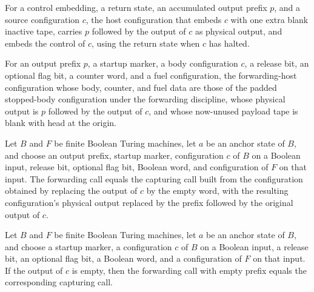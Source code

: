 \begin{definition}
\label{Turing.FinTM.emLoopForwardCfg}
\leanok
{}
For a control embedding, a return state, an accumulated output prefix $p$, and a source
configuration $c$, the host configuration that embeds $c$ with one extra blank inactive
tape, carries $p$ followed by the output of $c$ as physical output, and embeds the
control of $c$, using the return state when $c$ has halted.
\end{definition}

\begin{definition}
\label{Turing.FinTM.emLoopCall}
\leanok
{}
For an output prefix $p$, a startup marker, a body configuration $c$, a release bit, an
optional flag bit, a counter word, and a fuel configuration, the forwarding-host
configuration whose body, counter, and fuel data are those of the padded stopped-body
configuration under the forwarding discipline, whose physical output is $p$ followed by
the output of $c$, and whose now-unused payload tape is blank with head at the origin.
\end{definition}

\begin{lemma}
\label{Turing.FinTM.emLoopCall_frame}
\leanok
{}
Let $B$ and $F$ be finite Boolean Turing machines, let $a$ be an anchor state of $B$,
and choose an output prefix, startup marker, configuration $c$ of $B$ on a Boolean
input, release bit, optional flag bit, Boolean word, and configuration of $F$ on that
input. The forwarding call equals the capturing call built from the configuration
obtained by replacing the output of $c$ by the empty word, with the resulting
configuration's physical output replaced by the prefix followed by the original output
of $c$.
\end{lemma}

\begin{lemma}
\label{Turing.FinTM.emLoopCall_empty}
\leanok
{}
Let $B$ and $F$ be finite Boolean Turing machines, let $a$ be an anchor state of $B$,
and choose a startup marker, a configuration $c$ of $B$ on a Boolean input, a release
bit, an optional flag bit, a Boolean word, and a configuration of $F$ on that input. If
the output of $c$ is empty, then the forwarding call with empty prefix equals the
corresponding capturing call.
\end{lemma}

